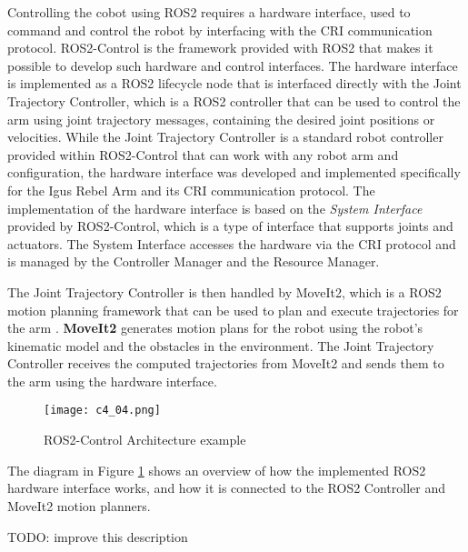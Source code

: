 Controlling the cobot using ROS2 requires a hardware interface, used to command and control the robot by interfacing
with the CRI communication protocol. ROS2-Control is the framework provided with ROS2 that makes it possible to develop such
hardware and control interfaces. The hardware interface is implemented as a ROS2 lifecycle node that
is interfaced directly with the Joint Trajectory Controller, which is a ROS2 controller that can be used to
control the arm using joint trajectory messages, containing the desired joint positions or velocities.
While the Joint Trajectory Controller is a standard robot controller provided within ROS2-Control that can work
with any robot arm and configuration, the hardware interface was developed and implemented specifically for the Igus Rebel Arm
and its CRI communication protocol. The implementation of the hardware interface is based on the \textit{System Interface}
provided by ROS2-Control, which is a type of interface that supports joints and actuators. The System Interface
accesses the hardware via the CRI protocol and is managed by the Controller Manager and the Resource Manager.

The Joint Trajectory Controller is then handled by MoveIt2, which is a ROS2
motion planning framework that can be used to plan and execute trajectories for the arm \cite{moveit2}.
\textbf{MoveIt2} generates motion plans for the robot using the robot's kinematic model and the obstacles in the environment.
The Joint Trajectory Controller receives the computed trajectories from MoveIt2 and sends them to the arm 
using the hardware interface.

\begin{figure}[t]
    \centering
    \texttt{[image: c4\_04.png]}
    \caption{ROS2-Control Architecture example}
    \label{fig:ros2control}
\end{figure}

The diagram in Figure \ref{fig:ros2control} shows an overview of how the implemented ROS2 hardware interface works,
and how it is connected to the ROS2 Controller and MoveIt2 motion planners.

TODO: improve this description

